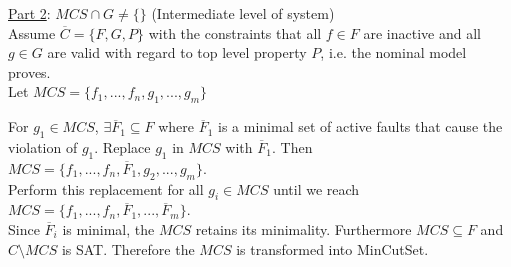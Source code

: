 \underline{Part 2}: $MCS \cap G \neq \{\}$ (Intermediate level of system)\\

Assume $\overline{C} = \{F,G,P\}$ with the constraints that all $f \in F$ are inactive and all $g\in G$ are valid with regard to top level property $P$, i.e. the nominal model proves. \\

Let $MCS = \{f_1,...,f_n,g_1,...,g_m\}$

For $g_1 \in MCS$, $\exists \overline{F}_1 \subseteq F$ where $\overline{F}_1$ is a minimal set of active faults that cause the violation of $g_1$.  Replace $g_1$ in $MCS$ with $\overline{F}_1$. Then $MCS = \{f_1,...,f_n, \overline{F}_1,g_2,...,g_m\}$. \\

Perform this replacement for all $g_i \in MCS$ until we reach $MCS = \{f_1,...,f_n,\overline{F}_1,...,\overline{F}_m\}$. \\

Since $\overline{F}_i$ is minimal, the $MCS$ retains its minimality. Furthermore $MCS \subseteq F$ and $C\setminus MCS$ is SAT. Therefore the $MCS$ is transformed into MinCutSet. 







































